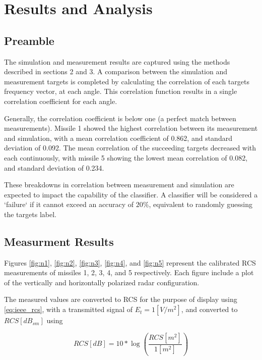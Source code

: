 \chapter{Results and Analysis}
\label{ch:results}
\glsresetall
\section{Preamble}

The simulation and measurement results are captured using the methods described in sections 2 and 3. A comparison between the simulation and measurement targets is completed by calculating the correlation of each targets frequency vector, at each angle. This correlation function results in a single correlation coefficient for each angle.

Generally, the correlation coefficient is below one (a perfect match between measurements). Missile 1 showed the highest correlation between its measurement and simulation, with a mean correlation coefficient of 0.862, and standard deviation of 0.092. The mean correlation of the succeeding targets decreased with each continuously, with missile 5 showing the lowest mean correlation of 0.082, and standard deviation of 0.234.

These breakdowns in correlation between measurement and simulation are expected to impact the capability of the classifier. A classifier will be considered a `failure` if it cannot exceed an accuracy of $20\%$, equivalent to randomly guessing the targets label.

\section{Measurment Results}
\label{sec:meas_res}

	Figures \ref{fig:n1}, \ref{fig:n2}, \ref{fig:n3}, \ref{fig:n4}, and \ref{fig:n5} represent the calibrated RCS measurements of missiles 1, 2, 3, 4, and 5 respectively. Each figure include a plot of the vertically and horizontally polarized radar configuration.

	The measured values are converted to RCS for the purpose of display using \ref{eq:ieee_rcs}, with a transmitted signal of $E_t = 1 [V/m^2]$, and converted to $RCS [dB_{sm}]$ using

	\begin{equation}\label{eq:rcs_db}
		RCS [dB] = 10 * \log \left( \frac{RCS [m^2]}{1 [m^2]}\right)
	\end{equation}

